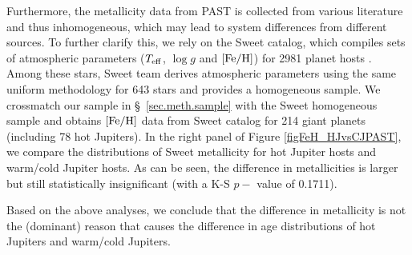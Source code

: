 \documentclass[twocolumn]{pnas-new}
\begin{document}
Furthermore, the metallicity data from PAST \uppercase\expandafter{} is collected from various literature and thus inhomogeneous, which may lead to system differences from different sources.
To further clarify this, we rely on the Sweet catalog, which compiles sets of atmospheric parameters ($T_{\rm eff}$, $\log g$ and $\rm [Fe/H]$) for 2981 planet hosts \citep{2013A&A...556A.150S}.
Among these stars, Sweet team derives atmospheric parameters using the same uniform methodology for 643 stars and provides a homogeneous sample.
We crossmatch our sample in \S~\ref{sec.meth.sample} with the Sweet homogeneous sample and obtains $\rm [Fe/H]$ data from Sweet catalog for 214 giant planets (including 78 hot Jupiters).
In the right panel of Figure \ref{figFeH_HJvsCJPAST}, we compare the distributions of Sweet metallicity for hot Jupiter hosts and warm/cold Jupiter hosts.
As can be seen, the difference in metallicities is larger but still statistically insignificant (with a K-S $p-$ value of 0.1711).

Based on the above analyses, we conclude that the difference in metallicity is not the (dominant) reason that causes the difference in age distributions of hot Jupiters and warm/cold Jupiters.
\end{document}
